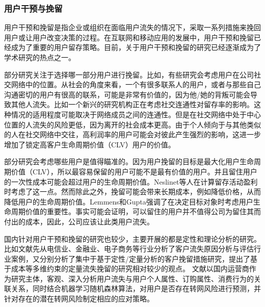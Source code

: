 \subsubsection{用户干预与挽留}
用户干预和挽留是指企业或组织在面临用户流失的情况下，采取一系列措施来挽回用户或让用户改变决策的过程。在互联网和移动应用的发展中，用户干预和挽留已经成为了重要的用户留存策略。目前，关于用户干预和挽留的研究已经逐渐成为了学术研究的热点之一。\par
部分研究关注于选择哪一部分用户进行挽留。比如，有些研究会考虑用户在公司社交网络中的位置。从社会的角度来看，一个有很多联系人的用户，或者与那些自己沟通密切的用户有很高的联系，可能是非常有价值的，因为他/她的背叛可能会导致其他人流失。比如一个新兴的研究机构正在考虑社交连通性对留存率的影响\cite{ebbes2015beyond,nitzan2011social}。这种情况的适用程度可能取决于网络成员之间的连通性。但是在社交网络中处于中心位置的人流失的风险更低，因为离开的社会成本更高。由于个人倾向于与其他类似的人在社交网络中交往，高利润率的用户可能会对彼此产生强烈的影响，这进一步增加了锁定高客户生命周期价值（CLV）用户的价值。\par
部分研究会考虑哪些用户是值得瞄准的。因为用户挽留的目标是最大化用户生命周期价值（CLV），所以最容易保留的用户可能不是最有价值的用户。并且留住用户的一次性成本可能会超过用户的生命周期价值。Neslinet等人\cite{neslin2004defection}在计算留存活动盈利时考虑了这一点。然而除此之外，挽留可能会带来长期成本，例如降低价格，从而降低用户的生命周期价值。Lemmens和Gupta\cite{lemmens2020managing}强调了在决定目标对象时考虑用户生命周期价值的重要性。事实可能会证明，可以留住的用户并不值得公司为留住其而付出的成本，因此，公司应该让此类用户流失。\par
国内针对用户干预和挽留的研究也较少，主要开展的都是定性和理论分析的研究。比如文献\cite{于小兵2012客户流失问题研究综述}先从电信业、金融业、电子商务等行业分析了客户流失原因分析与评估行业案例，又分别分析了集中于基于定性/定量分析的客户挽留措施研究，提出了基于成本等多维约束的定量流失挽留的研究相对较少的观点。
文献\cite{龙克树2020基于机器学习算法的运营商用户流失预判及应对策略研究}以国内运营商作为研究主体，客观、深入分析用户流失与用户个人属性、订购属性、消费行为的关联关系，同时结合机器学习随机森林算法，对用户是否存在转网风险进行预测，并针对存在的潜在转网风险制定相应的应对策略。
\par

